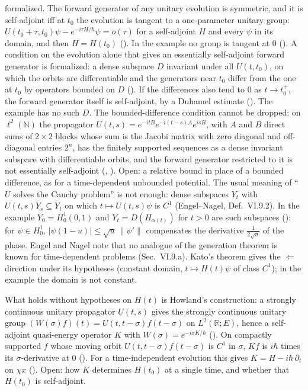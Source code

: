 \documentclass[11pt]{article}
\begin{document}
\begin{enumerate}
\begin{enumerate}
    formalized. The forward generator of any unitary evolution is symmetric, and it is
    self-adjoint iff at $t_0$ the evolution is tangent to a one-parameter unitary group:
    $U(t_0+\tau,t_0)\psi - e^{-i\tau H/\hbar}\psi = o(\tau)$ for a self-adjoint $H$ and every
    $\psi$ in its domain, and then $H = H(t_0)$
    (). In the example no group is tangent at $0$
    (). A condition on the evolution alone that gives an
    essentially self-adjoint forward generator is formalized: a dense subspace $D$ invariant
    under all $U(t,t_0)$, on which the orbits are differentiable and the generators near $t_0$
    differ from the one at $t_0$ by operators bounded on $D$
    (). If the differences also tend to $0$
    as $t \to t_0^+$, the forward generator itself is self-adjoint, by a Duhamel estimate
    (). The example has no such $D$. The
    bounded-difference condition cannot be dropped: on $\ell^2(\mathbb{N})$ the propagator
    $U(t,s) = e^{-itB}e^{-i(t-s)A}e^{isB}$, with $A$ and $B$ direct sums of $2 \times 2$ blocks
    whose sum is the Jacobi matrix with zero diagonal and off-diagonal entries $2^n$, has the
    finitely supported sequences as a dense invariant subspace with differentiable orbits, and
    the forward generator restricted to it is not essentially self-adjoint
    (, ). Open: a relative
    bound in place of a bounded difference, as for a time-dependent unbounded potential. The usual meaning of ``$U$ solves the
    Cauchy problem'' is not enough: dense subspaces $Y_t$ with $U(t,s)Y_s \subseteq Y_t$ on
    which $t \mapsto U(t,s)\psi$ is $C^1$ (Engel--Nagel, Def.~VI.9.2). In the example
    $Y_0 = H^1_0(0,1)$ and $Y_t = D(H_{\alpha(t)})$ for $t > 0$ are such subspaces
    (): for $\psi \in H^1_0$, $|\psi(1-u)| \le \sqrt u\,\|\psi'\|$
    compensates the derivative $\tfrac1{2\sqrt u}$ of the phase. Engel and Nagel note that no analogue of the
    generation theorem is known for time-dependent problems (Sec.~VI.9.a). Kato's theorem gives
    the $\Leftarrow$ direction under its hypotheses (constant domain, $t\mapsto H(t)\psi$ of
    class $C^1$); in the example the domain is not constant.
  \end{enumerate}
  What holds without hypotheses on $H(t)$ is Howland's construction: a strongly continuous
  unitary propagator $U(t,s)$ gives the strongly continuous unitary group
  $(W(\sigma)f)(t) = U(t,t-\sigma)f(t-\sigma)$ on $L^2(\mathbb{R};E)$, hence a self-adjoint
  quasi-energy operator $K$ with $W(\sigma) = e^{-i\sigma K/\hbar}$
  (). On compactly supported $f$ whose moving
  orbit $U(t,t-\sigma)f(t-\sigma)$ is $C^1$ in $\sigma$, $K f$ is $i\hbar$ times its
  $\sigma$-derivative at $0$ (). For a
  time-independent evolution this gives $K = H - i\hbar\,\partial_t$ on $\chi x$
  (). Open: how $K$ determines
  $H(t_0)$ at a single time, and whether that $H(t_0)$ is self-adjoint.


\end{enumerate}
\end{document}
